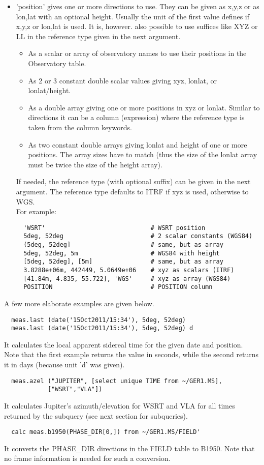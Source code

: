 \begin{itemize}
\item 'position' gives one or more directions to use. They can be
  given as x,y,z or as lon,lat with an optional height. Usually the
  unit of the first value defines if x,y,z or lon,lat is used. It is, however. also
  possible to use suffices like XYZ or LL in the reference type given
  in the next argument.
  \begin{itemize}
    \item As a scalar or array of observatory names to use their positions
      in the Observatory table.
    \item As 2 or 3 constant double scalar values giving xyz, lonlat,
      or lonlat/height.
    \item As a double array giving one or more positions in xyz or
      lonlat. Similar to directions it can be a column (expression)
      where the reference type is taken from the column keywords.
    \item As two constant double arrays giving lonlat and height of
      one or more positions. The array sizes have to match (thus the
      size of the lonlat array must be twice the size of the height array).
  \end{itemize}
  If needed, the reference type (with optional suffix) can be given in
  the next argument. The reference type defaults to ITRF if xyz is used,
  otherwise to WGS.
  \\For example:
\begin{verbatim}
  'WSRT'                             # WSRT position
  5deg, 52deg                        # 2 scalar constants (WGS84)
  (5deg, 52deg]                      # same, but as array
  5deg, 52deg, 5m                    # WGS84 with height
  [5deg, 52deg], [5m]                # same, but as array
  3.8288e+06m, 442449, 5.0649e+06    # xyz as scalars (ITRF)
  [41.84m, 4.835, 55.722], 'WGS'     # xyz as array (WGS84)
  POSITION                           # POSITION column
\end{verbatim}
\end{itemize}
A few more elaborate examples are given below.
\begin{verbatim}
  meas.last (date('15Oct2011/15:34'), 5deg, 52deg)
  meas.last (date('15Oct2011/15:34'), 5deg, 52deg) d
\end{verbatim}
It calculates the local apparent sidereal time for the given date and
position. Note that the first example returns the value in seconds,
while the second returns it in days (because unit 'd' was given).
\begin{verbatim}
  meas.azel ("JUPITER", [select unique TIME from ~/GER1.MS],
            ["WSRT","VLA"])
\end{verbatim}
It calculates Jupiter's azimuth/elevation for WSRT and VLA for all
times returned by the subquery (see next section for subqueries).
\begin{verbatim}
  calc meas.b1950(PHASE_DIR[0,]) from ~/GER1.MS/FIELD'
\end{verbatim}
It converts the PHASE\_DIR directions in the FIELD table to B1950. Note
that no frame information is needed for such a conversion.


